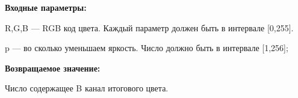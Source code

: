 \textbf{Входные параметры:}  

R,G,B --- RGB код цвета. Каждый параметр должен быть в интервале [0,255].

p --- во сколько уменьшаем яркость. Число должно быть в интервале [1,256];

\textbf{Возвращаемое значение:}

Число содержащее B канал итогового цвета.